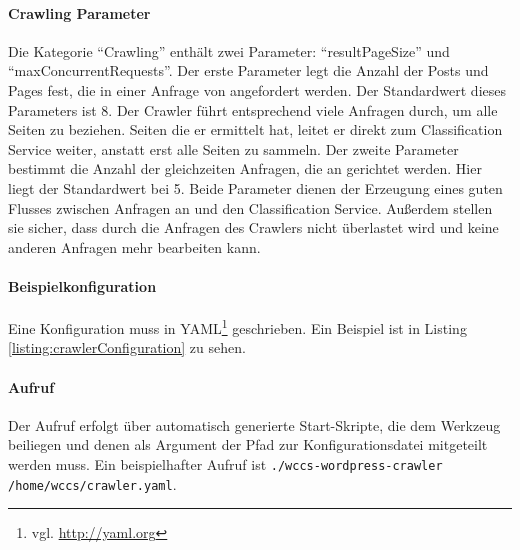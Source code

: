     \paragraph{Crawling Parameter}
    Die Kategorie "`Crawling"' enthält zwei Parameter:
    "`resultPageSize"' und "`maxConcurrentRequests"'.
    Der erste Parameter legt die Anzahl der Posts und Pages fest,
    die in einer Anfrage von {\wordpress} angefordert werden.
    Der Standardwert dieses Parameters ist 8.
    Der Crawler führt entsprechend viele Anfragen durch,
    um alle Seiten zu beziehen.
    Seiten die er ermittelt hat, leitet er direkt zum Classification Service weiter,
    anstatt erst alle Seiten zu sammeln.
    Der zweite Parameter bestimmt die Anzahl der gleichzeiten Anfragen,
    die an {\wordpress} gerichtet werden.
    Hier liegt der Standardwert bei 5.
    Beide Parameter dienen der Erzeugung eines guten Flusses zwischen Anfragen an
    {\wordpress} und den Classification Service.
    Außerdem stellen sie sicher, dass {\wordpress} durch die Anfragen des Crawlers
    nicht überlastet wird und keine anderen Anfragen mehr bearbeiten kann.

    \paragraph{Beispielkonfiguration}
    Eine Konfiguration muss in YAML\footnote{vgl. \url{http://yaml.org}} geschrieben.
    Ein Beispiel ist in Listing \ref{listing:crawlerConfiguration} zu sehen.

    

    \paragraph{Aufruf}
    Der Aufruf erfolgt über automatisch generierte Start-Skripte,
    die dem Werkzeug beiliegen und denen als Argument
    der Pfad zur Konfigurationsdatei mitgeteilt werden muss.
    Ein beispielhafter Aufruf ist \texttt{./wccs-wordpress-crawler /home/wccs/crawler.yaml}.

